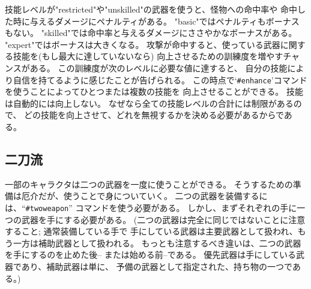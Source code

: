 技能レベルが"restricted"や"unskilled"の武器を使うと、怪物への命中率や
命中した時に与えるダメージにペナルティがある。
"basic"ではペナルティもボーナスもない。
"skilled"では命中率と与えるダメージにささやかなボーナスがある。
"expert"ではボーナスは大きくなる。
攻撃が命中すると、使っている武器に関する技能を(もし最大に達していないなら)
向上させるための訓練度を増やすチャンスがある。
この訓練度が次のレベルに必要な値に達すると、
自分の技能により自信を持てるように感じたことが告げられる。
この時点で`{\tt \#enhance}'コマンドを使うことによってひとつまたは複数の技能を
向上させることができる。
技能は自動的には向上しない。
なぜなら全ての技能レベルの合計には制限があるので、
どの技能を向上させて、どれを無視するかを決める必要があるからである。

\subsection*{二刀流}

一部のキャラクタは二つの武器を一度に使うことができる。
そうするための準備は厄介だが、使うことで身についていく。
二つの武器を装備するには、``{\tt \#twoweapon}'' コマンドを使う必要がある。
しかし、まずそれぞれの手に一つの武器を手にする必要がある。
(二つの武器は完全に同じではないことに注意すること; 通常装備している手で
手にしている武器は主要武器として扱われ、もう一方は補助武器として扱われる。
もっとも注意するべき違いは、二つの武器を手にするのを止めた後--
または始める前--である。
優先武器は手にしている武器であり、補助武器は単に、
予備の武器として指定された、持ち物の一つである。)

